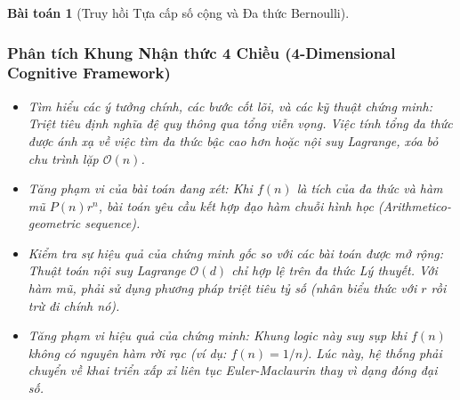 \documentclass{article}
\newtheorem{baitoan}{Bài toán}
\begin{document}
\begin{baitoan}[Truy hồi Tựa cấp số cộng và Đa thức Bernoulli]
 \subsubsection*{Phân tích Khung Nhận thức 4 Chiều (4-Dimensional Cognitive Framework)}
 \begin{itemize}
 \item \textit{Tìm hiểu các ý tưởng chính, các bước cốt lõi, và các kỹ thuật chứng minh}: Triệt tiêu định nghĩa đệ quy thông qua tổng viễn vọng. Việc tính tổng đa thức được ánh xạ về việc tìm đa thức bậc cao hơn hoặc nội suy Lagrange, xóa bỏ chu trình lặp $\mathcal{O}(n)$.
 \item \textit{Tăng phạm vi của bài toán đang xét}: Khi $f(n)$ là tích của đa thức và hàm mũ $P(n)r^n$, bài toán yêu cầu kết hợp đạo hàm chuỗi hình học (Arithmetico-geometric sequence).
 \item \textit{Kiểm tra sự hiệu quả của chứng minh gốc so với các bài toán được mở rộng}: Thuật toán nội suy Lagrange $\mathcal{O}(d)$ chỉ hợp lệ trên đa thức Lý thuyết. Với hàm mũ, phải sử dụng phương pháp triệt tiêu tỷ số (nhân biểu thức với $r$ rồi trừ đi chính nó).
 \item \textit{Tăng phạm vi hiệu quả của chứng minh}: Khung logic này suy sụp khi $f(n)$ không có nguyên hàm rời rạc (ví dụ: $f(n) = 1/n$). Lúc này, hệ thống phải chuyển về khai triển xấp xỉ liên tục Euler-Maclaurin thay vì dạng đóng đại số.
 \end{itemize}
\end{baitoan}

\end{document}
